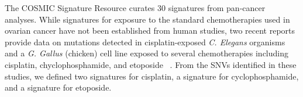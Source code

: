 The COSMIC Signature Resource curates 30 signatures from pan-cancer analyses. While signatures for exposure to the standard chemotherapies used in ovarian cancer have not been established from human studies, two recent reports provide data on mutations detected in cisplatin-exposed \textit{C. Elegans} organisms~\cite{Meier_2014} and a \textit{G. Gallus} (chicken) cell line exposed to several chemotherapies including cisplatin, chyclophosphamide, and etoposide ~\cite{Szikriszt_2016}. From the SNVs identified in these studies, we defined two signatures for cisplatin, a signature for cyclophosphamide, and a signature for etoposide.






